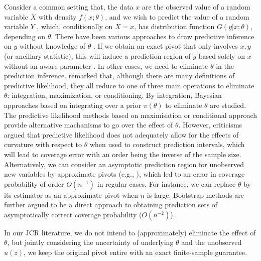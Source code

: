 \documentclass[english]{article}
\begin{document}
Consider a common setting that, the data $x$  are the observed value of a random variable $X$ with density $f (x; \theta)$, and we wish to predict the value of a random variable $Y$ ,
which, conditionally on $X = x$, has distribution function $G(y | x; \theta)$, depending on $\theta$.
There have been various approaches to draw predictive inference on $y$ without knowledge of $\theta$ \citep{young2005essentials}. If we obtain an exact pivot that only involves $x,y$ (or ancillary statistic), this will induce a prediction region of $y$ based solely on $x$ without an aware parameter . In other cases, we need to eliminate $\theta$ in the prediction inference. \cite{bjornstad1990predictive} remarked that, although there are many definitions of predictive likelihood, they all reduce to one of three main operations to eliminate $\theta$: integration, maximization, or conditioning.
By integration, Bayesian approaches based on integrating over a prior $\pi(\theta)$ to eliminate $\theta$ are studied.  The predictive likelihood methods based on maximisation \citep{mathiasen1979prediction} or conditional approach \citep{hinkley1979predictive,lauritzen1974sufficiency} provide alternative machanisms to go over the effect of $\theta$. 
However, criticisms \citep{hall1999prediction} argued that predictive likelihood does not adequately allow for the  effects of curvature with respect to $\theta$ when used to construct prediction intervals, which will lead to coverage error with an order being the inverse of the sample size.
Alternatively, we can consider an asymptotic prediction region for unobserved new variables by approximate pivots (e.g., \cite{cox1975prediction}), which led to an error in coverage probability of order $O(n^{-1})$ in regular cases.
For instance, we can replace $\theta$ by its estimator as an approximate pivot when $n$ is large. 
Bootstrap methods \citep{harris1989predictive} are further argued to be a direct approach to obtaining prediction sets of asymptotically correct coverage probability ($O(n^{-2})$).

In our JCR literature, we do not intend to (approximately) eliminate the effect of $\theta$, but jointly considering the uncertainty of underlying $\theta$ and the unobserved $u(z)$, we keep the original pivot entire with an exact finite-sample guarantee. 
\end{document}
